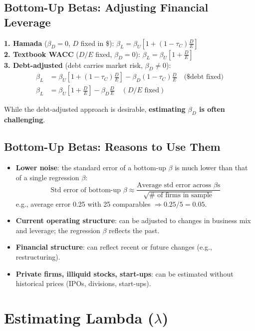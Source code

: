 \subsection{Bottom-Up Betas: Adjusting Financial Leverage}
\begin{keybox}
\textbf{1. Hamada} ($\beta_D=0$, $D$ fixed in \$): \quad $\beta_L=\beta_U\left[1+(1-\tau_C)\frac{D}{E}\right]$\\[4pt]
\textbf{2. Textbook WACC} ($D/E$ fixed, $\beta_D=0$): \quad $\beta_L=\beta_U\left[1+\frac{D}{E}\right]$\\[4pt]
\textbf{3. Debt-adjusted} (debt carries market risk, $\beta_D\neq0$):
\begin{align*}
\beta_L&=\beta_U\left[1+(1-\tau_C)\frac{D}{E}\right]-\beta_D(1-\tau_C)\frac{D}{E}\quad\text{(\$ debt fixed)}\\
\beta_L&=\beta_U\left[1+\frac{D}{E}\right]-\beta_D\frac{D}{E}\quad(D/E\text{ fixed})
\end{align*}
\end{keybox}
While the debt-adjusted approach is desirable, \textbf{estimating $\beta_D$ is often challenging}.

\subsection{Bottom-Up Betas: Reasons to Use Them}
\begin{itemize}
  \item \textbf{Lower noise}: the standard error of a bottom-up $\beta$ is much lower than that of a single regression $\beta$:
  \[
  \text{Std error of bottom-up }\beta\approx\frac{\text{Average std error across }\beta\text{s}}{\sqrt{\#\text{ of firms in sample}}}
  \]
  e.g., average error 0.25 with 25 comparables $\Rightarrow0.25/5=0.05$.
  \item \textbf{Current operating structure}: can be adjusted to changes in business mix and leverage; the regression $\beta$ reflects the past.
  \item \textbf{Financial structure}: can reflect recent or future changes (e.g., restructuring).
  \item \textbf{Private firms, illiquid stocks, start-ups}: can be estimated without historical prices (IPOs, divisions, start-ups).
\end{itemize}

\section{Estimating Lambda ($\lambda$)}

